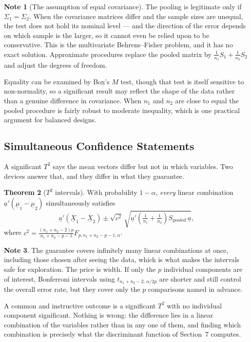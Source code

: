 \documentclass[11pt,a4paper]{article}
\theoremstyle{definition}
\newtheorem{thm}{Theorem}[section]
\newtheorem{note}[thm]{Note}
\begin{document}
\begin{note}[The assumption of equal covariance]
The pooling is legitimate only if $\Sigma_1=\Sigma_2$. When the covariance
matrices differ and the sample sizes are unequal, the test does not hold its
nominal level --- and the direction of the error depends on which sample is the
larger, so it cannot even be relied upon to be conservative. This is the
multivariate Behrens--Fisher problem, and it has no exact solution. Approximate
procedures replace the pooled matrix by
$\tfrac{1}{n_1}S_1+\tfrac{1}{n_2}S_2$ and adjust the degrees of freedom.

Equality can be examined by Box's $M$ test, though that test is itself sensitive
to non-normality, so a significant result may reflect the shape of the data
rather than a genuine difference in covariance. When $n_1$ and $n_2$ are close
to equal the pooled procedure is fairly robust to moderate inequality, which is
one practical argument for balanced designs.
\end{note}

\subsection{Simultaneous Confidence Statements}

A significant $T^{2}$ says the mean vectors differ but not in which variables.
Two devices answer that, and they differ in what they guarantee.

\begin{thm}[$T^{2}$ intervals]
With probability $1-\alpha$, \emph{every} linear combination
$\underline{a}'\left(\underline{\mu}_1-\underline{\mu}_2\right)$ simultaneously
satisfies
$$\underline{a}'\left(\overline{\underline{X}}_1-\overline{\underline{X}}_2\right)
\pm \sqrt{c^{2}}\,
\sqrt{\underline{a}'\left(\tfrac{1}{n_1}+\tfrac{1}{n_2}\right)S_{\text{pooled}}\,\underline{a}},$$
where $c^{2} = \frac{(n_1+n_2-2)p}{n_1+n_2-p-1}F_{p,n_1+n_2-p-1,\alpha}$.
\end{thm}

\begin{note}
The guarantee covers infinitely many linear combinations at once, including
those chosen after seeing the data, which is what makes the intervals safe for
exploration. The price is width. If only the $p$ individual components are of
interest, Bonferroni intervals using $t_{n_1+n_2-2,\,\alpha/2p}$ are shorter and
still control the overall error rate, but they cover only the $p$ comparisons
named in advance.

A common and instructive outcome is a significant $T^{2}$ with no individual
component significant. Nothing is wrong: the difference lies in a linear
combination of the variables rather than in any one of them, and finding which
combination is precisely what the discriminant function of Section~7 computes.
\end{note}
\end{document}
